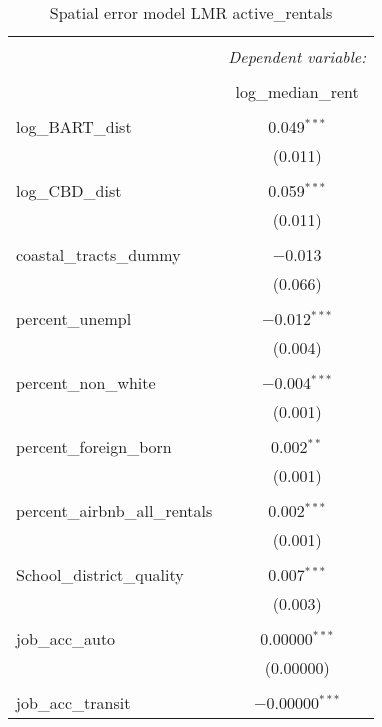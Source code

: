 \documentclass[10pt, letterpaper]{amsart}
\begin{document}
\begin{table}[H] \centering 
  \caption{Spatial error model LMR active\_rentals}
  \label{} 
  \begin{tabular}{@{\extracolsep{5pt}}lc} 
    \\[-1.8ex]\hline 
    \hline \\[-1.8ex] 
    & \multicolumn{1}{c}{\textit{Dependent variable:}} \\ 
    \cline{2-2} 
    \\[-1.8ex] & log\_median\_rent \\ 
    \hline \\[-1.8ex] 
    log\_BART\_dist & 0.049$^{***}$ \\ 
    & (0.011) \\ 
    & \\ 
    log\_CBD\_dist & 0.059$^{***}$ \\ 
    & (0.011) \\ 
    & \\ 
    coastal\_tracts\_dummy & $-$0.013 \\ 
    & (0.066) \\ 
    & \\ 
    percent\_unempl & $-$0.012$^{***}$ \\ 
    & (0.004) \\ 
    & \\ 
    percent\_non\_white & $-$0.004$^{***}$ \\ 
    & (0.001) \\ 
    & \\ 
    percent\_foreign\_born & 0.002$^{**}$ \\ 
    & (0.001) \\ 
    & \\ 
    percent\_airbnb\_all\_rentals & 0.002$^{***}$ \\ 
    & (0.001) \\ 
    & \\ 
    School\_district\_quality & 0.007$^{***}$ \\ 
    & (0.003) \\ 
    & \\ 
    job\_acc\_auto & 0.00000$^{***}$ \\ 
    & (0.00000) \\ 
    & \\ 
    job\_acc\_transit & $-$0.00000$^{***}$ \\ 

\end{tabular}
\end{table}
\end{document}
